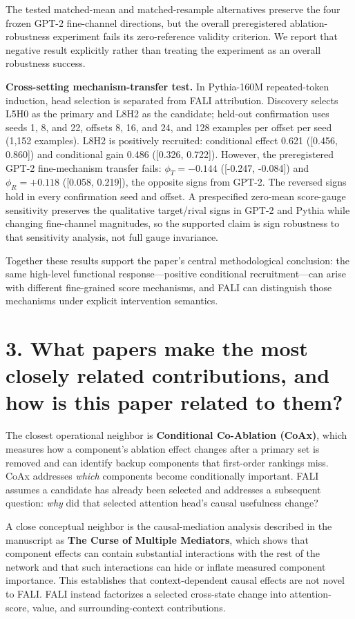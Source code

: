 \documentclass[10pt]{article}
\begin{document}
The tested matched-mean and matched-resample alternatives preserve the four frozen GPT-2 fine-channel directions, but the overall preregistered ablation-robustness experiment fails its zero-reference validity criterion. We report that negative result explicitly rather than treating the experiment as an overall robustness success.

\textbf{Cross-setting mechanism-transfer test.} In Pythia-160M repeated-token induction, head selection is separated from FALI attribution. Discovery selects L5H0 as the primary and L8H2 as the candidate; held-out confirmation uses seeds 1, 8, and 22, offsets 8, 16, and 24, and 128 examples per offset per seed (1,152 examples). L8H2 is positively recruited: conditional effect 0.621 ([0.456, 0.860]) and conditional gain 0.486 ([0.326, 0.722]). However, the preregistered GPT-2 fine-mechanism transfer fails: $\phi_T=-0.144$ ([-0.247, -0.084]) and $\phi_R=+0.118$ ([0.058, 0.219]), the opposite signs from GPT-2. The reversed signs hold in every confirmation seed and offset. A prespecified zero-mean score-gauge sensitivity preserves the qualitative target/rival signs in GPT-2 and Pythia while changing fine-channel magnitudes, so the supported claim is sign robustness to that sensitivity analysis, not full gauge invariance.

Together these results support the paper's central methodological conclusion: the same high-level functional response---positive conditional recruitment---can arise with different fine-grained score mechanisms, and FALI can distinguish those mechanisms under explicit intervention semantics.

\section*{3. What papers make the most closely related contributions, and how is this paper related to them?}

The closest operational neighbor is \textbf{Conditional Co-Ablation (CoAx)}, which measures how a component's ablation effect changes after a primary set is removed and can identify backup components that first-order rankings miss. CoAx addresses \emph{which} components become conditionally important. FALI assumes a candidate has already been selected and addresses a subsequent question: \emph{why} did that selected attention head's causal usefulness change?

A close conceptual neighbor is the causal-mediation analysis described in the manuscript as \textbf{The Curse of Multiple Mediators}, which shows that component effects can contain substantial interactions with the rest of the network and that such interactions can hide or inflate measured component importance. This establishes that context-dependent causal effects are not novel to FALI. FALI instead factorizes a selected cross-state change into attention-score, value, and surrounding-context contributions.
\end{document}
